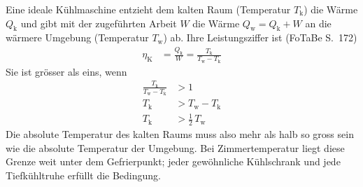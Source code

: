 Eine ideale Kühlmaschine entzieht dem kalten Raum (Temperatur $T_\text{k}$) die Wärme $Q_\text{k}$ und gibt mit der zugeführten Arbeit $W$ die Wärme $Q_\text{w} = Q_\text{k}+W$ an die wärmere Umgebung (Temperatur $T_\text{w}$) ab. Ihre Leistungsziffer ist (FoTaBe S.~172)
\begin{align}
 \eta_\text{K} &= \frac{Q_\text{k}}{W} = \frac{T_\text{k}}{T_\text{w}-T_\text{k}}
\end{align}
Sie ist grösser als eins, wenn
\begin{align}
 \frac{T_\text{k}}{T_\text{w}-T_\text{k}} &> 1 \\
 T_\text{k} &> T_\text{w}-T_\text{k} \\
 T_\text{k} &> \frac{1}{2}\,T_\text{w}
\end{align}
Die absolute Temperatur des kalten Raums muss also mehr als halb so gross sein wie die absolute Temperatur der Umgebung. Bei Zimmertemperatur liegt diese Grenze weit unter dem Gefrierpunkt; jeder gewöhnliche Kühlschrank und jede Tiefkühltruhe erfüllt die Bedingung.
